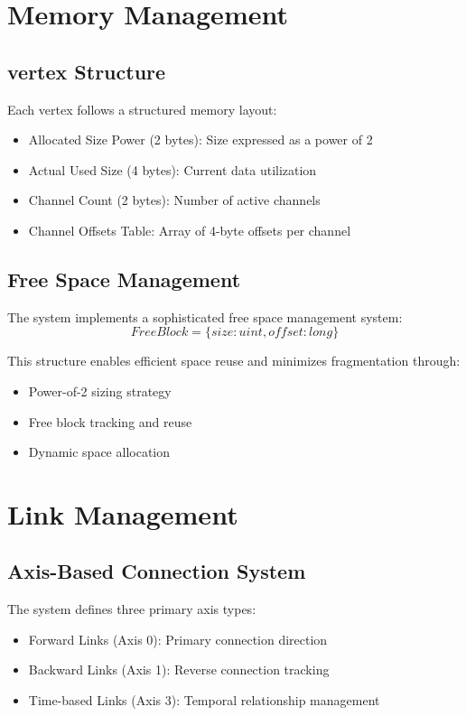 \section{Memory Management}\label{Sec:Memory}
\subsection{vertex Structure}
Each vertex follows a structured memory layout:
\begin{itemize}
    \item Allocated Size Power (2 bytes): Size expressed as a power of 2
    \item Actual Used Size (4 bytes): Current data utilization
    \item Channel Count (2 bytes): Number of active channels
    \item Channel Offsets Table: Array of 4-byte offsets per channel
\end{itemize}

\subsection{Free Space Management}
The system implements a sophisticated free space management system:
\begin{equation}
    FreeBlock = \{size: uint, offset: long\}
\end{equation}

This structure enables efficient space reuse and minimizes fragmentation through:
\begin{itemize}
    \item Power-of-2 sizing strategy
    \item Free block tracking and reuse
    \item Dynamic space allocation
\end{itemize}

\section{Link Management}\label{Sec:Links}
\subsection{Axis-Based Connection System}
The system defines three primary axis types:
\begin{itemize}
    \item Forward Links (Axis 0): Primary connection direction
    \item Backward Links (Axis 1): Reverse connection tracking
    \item Time-based Links (Axis 3): Temporal relationship management
\end{itemize}

